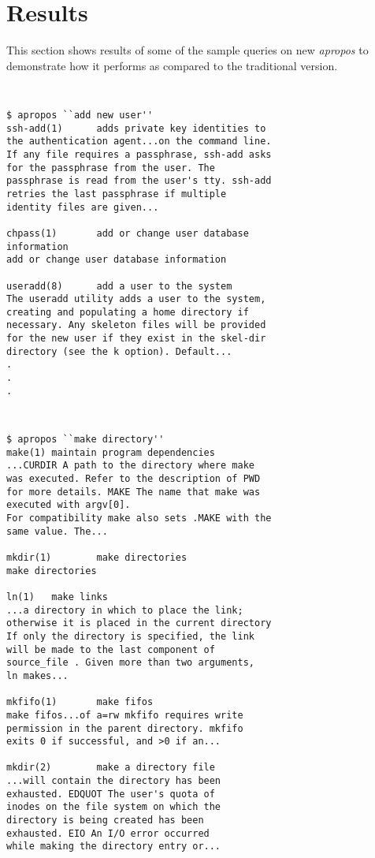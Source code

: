 \documentclass[letterpaper,twocolumn,10pt]{article}
\begin{document}
\section{Results}
This section shows results of some of the sample queries on new \textit{apropos}
to demonstrate how it performs as compared to the traditional version.
 \\

{\tt \small
{}
\begin{lstlisting}
$ apropos ``add new user''
ssh-add(1)      adds private key identities to
the authentication agent...on the command line.
If any file requires a passphrase, ssh-add asks
for the passphrase from the user. The
passphrase is read from the user's tty. ssh-add
retries the last passphrase if multiple
identity files are given...

chpass(1)       add or change user database
information
add or change user database information

useradd(8)      add a user to the system
The useradd utility adds a user to the system,
creating and populating a home directory if
necessary. Any skeleton files will be provided
for the new user if they exist in the skel-dir
directory (see the k option). Default...
.
.
.
\end{lstlisting}
}

{\tt \small
{}
\begin{lstlisting}
$ apropos ``make directory''
make(1) maintain program dependencies
...CURDIR A path to the directory where make
was executed. Refer to the description of PWD
for more details. MAKE The name that make was
executed with argv[0].
For compatibility make also sets .MAKE with the
same value. The...

mkdir(1)        make directories
make directories

ln(1)   make links
...a directory in which to place the link;
otherwise it is placed in the current directory
If only the directory is specified, the link
will be made to the last component of
source_file . Given more than two arguments,
ln makes...

mkfifo(1)       make fifos
make fifos...of a=rw mkfifo requires write
permission in the parent directory. mkfifo
exits 0 if successful, and >0 if an...

mkdir(2)        make a directory file
...will contain the directory has been
exhausted. EDQUOT The user's quota of
inodes on the file system on which the
directory is being created has been
exhausted. EIO An I/O error occurred
while making the directory entry or...
\end{lstlisting}
}
\end{document}
